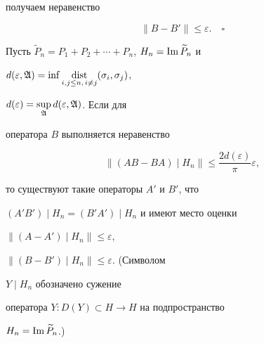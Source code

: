 получаем неравенство


$$


\|B-B'\|\le\varepsilon.\quad \square


$$





\begin{cornonum}


Пусть $\widetilde P_n=P_1+P_2+\dotsb+P_n$, $H_n=\operatorname{Im}\widetilde P_n$ и


$d(\varepsilon,\frak A)=


\inf\dist\limits_{i,j\le n,\,i\ne j}(\sigma_i,\sigma_j)$,


$d(\varepsilon)=\sup\limits_{\frak A}d(\varepsilon,\frak A)$. Если для


оператора $B$ выполняется неравенство


$$


\|(AB-BA)\mid H_n\|\le


\frac{2d(\varepsilon)}{\pi}\varepsilon,


$$


то существуют такие операторы $A'$ и $B'$, что


$(A'B')\mid H_n=(B'A')\mid H_n$ и имеют место оценки


$\|(A-A')\mid H_n\|\le\varepsilon$,


$\|(B-B')\mid H_n\|\le \varepsilon$. (Символом


$Y\mid H_n$ обозначено сужение


оператора $Y:D(Y)\subset H\to H$ на подпространство


$H_n=\operatorname{Im}\widetilde P_n$.)


\end{cornonum}





